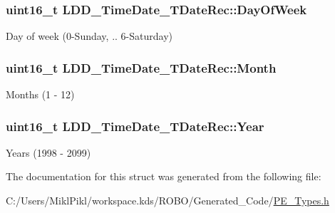 \subsubsection[{Day\+Of\+Week}]{\setlength{\rightskip}{0pt plus 5cm}uint16\+\_\+t L\+D\+D\+\_\+\+Time\+Date\+\_\+\+T\+Date\+Rec\+::\+Day\+Of\+Week}\label{struct_l_d_d___time_date___t_date_rec_a11ed8bc2e3fbd80252a7d4802d316f1c}
Day of week (0-\/\+Sunday, .. 6-\/\+Saturday) \hypertarget{struct_l_d_d___time_date___t_date_rec_a28aaeffe98b07d60db379d12269fa822}{}
\subsubsection[{Month}]{\setlength{\rightskip}{0pt plus 5cm}uint16\+\_\+t L\+D\+D\+\_\+\+Time\+Date\+\_\+\+T\+Date\+Rec\+::\+Month}\label{struct_l_d_d___time_date___t_date_rec_a28aaeffe98b07d60db379d12269fa822}
Months (1 -\/ 12) \hypertarget{struct_l_d_d___time_date___t_date_rec_a58eee644efb4f46adc3437063c7bc194}{}
\subsubsection[{Year}]{\setlength{\rightskip}{0pt plus 5cm}uint16\+\_\+t L\+D\+D\+\_\+\+Time\+Date\+\_\+\+T\+Date\+Rec\+::\+Year}\label{struct_l_d_d___time_date___t_date_rec_a58eee644efb4f46adc3437063c7bc194}
Years (1998 -\/ 2099) 

The documentation for this struct was generated from the following file\+:\begin{DoxyCompactItemize}
\item 
C\+:/\+Users/\+Mikl\+Pikl/workspace.\+kds/\+R\+O\+B\+O/\+Generated\+\_\+\+Code/\hyperlink{_p_e___types_8h}{P\+E\+\_\+\+Types.\+h}\end{DoxyCompactItemize}
